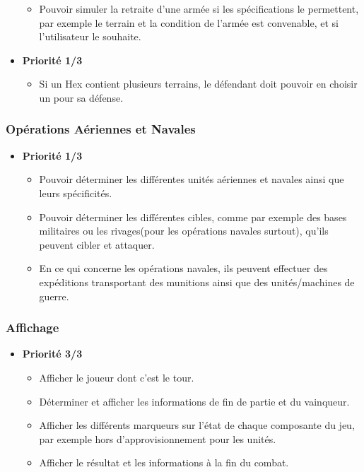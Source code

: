 \begin{itemize}
\begin{itemize}
\begin{itemize}
        \end{itemize}
        \item Pouvoir simuler la retraite d'une armée si les spécifications le permettent, par exemple le terrain et la condition de l'armée est convenable, et si l'utilisateur le souhaite.
    \end{itemize}
    \item \textbf{Priorité 1/3}
    \begin{itemize}
        \item Si un Hex contient plusieurs terrains, le défendant doit pouvoir en choisir un pour sa défense.
    \end{itemize}
\end{itemize}

\subsubsection{Opérations Aériennes et Navales}
\begin{itemize}
    \item \textbf{Priorité 1/3}
    \begin{itemize}
        \item Pouvoir déterminer les différentes unités aériennes et navales ainsi que leurs spécificités.\xmark
        \item Pouvoir déterminer les différentes cibles, comme par exemple des bases militaires ou les rivages(pour les opérations navales surtout), qu'ils peuvent cibler et attaquer.\xmark
        \item En ce qui concerne les opérations navales, ils peuvent effectuer des expéditions transportant des munitions ainsi que des unités/machines de guerre.\xmark
    \end{itemize}
\end{itemize}

\subsubsection{Affichage}
\begin{itemize}
    \item \textbf{Priorité 3/3}
    \begin{itemize}
        \item Afficher le joueur dont c'est le tour.\cmark
        \item Déterminer et afficher les informations de fin de partie et du vainqueur.
        \item Afficher les différents marqueurs sur l'état de chaque composante du jeu, par exemple hors d'approvisionnement pour les unités.\cmark
        \item Afficher le résultat et les informations à la fin du combat.\cmark
    \end{itemize}
\end{itemize}

